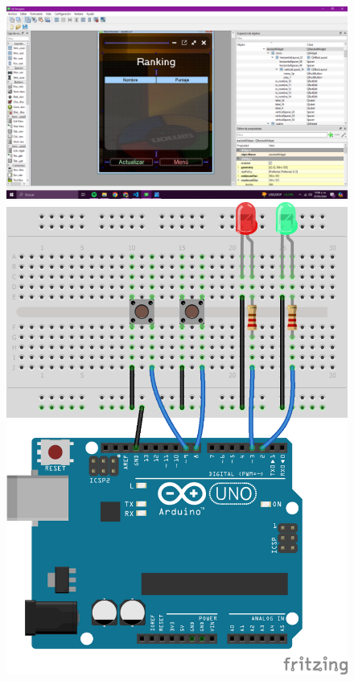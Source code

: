 \documentclass{article}
\begin{document}
{{\begin{figure}[h]            
    \begin{minipage}{0.55\textwidth}  
        \includegraphics[width=\textwidth]{Captura de pantalla (763).png}
    \end{minipage}
    \hfill
    \begin{minipage}{0.5\textwidth}
        \includegraphics[width=\textwidth]{arduino-proto-04-push-ledes-bb.png}
    \end{minipage}
    

\end{figure}}}
\end{document}
